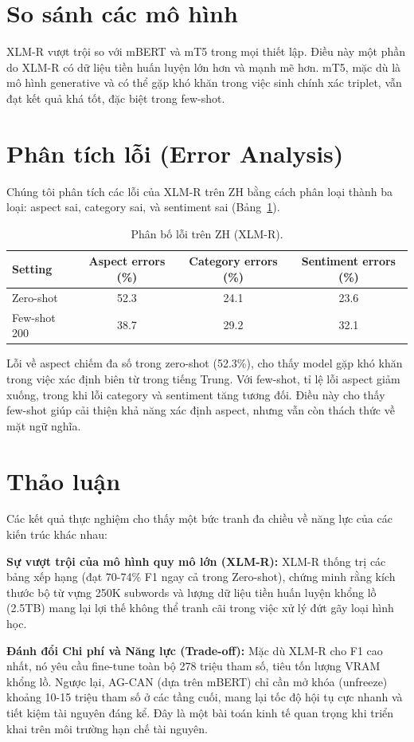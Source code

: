 \documentclass[12pt,a4paper,oneside]{report}
\begin{document}
\section{So sánh các mô hình}
XLM-R vượt trội so với mBERT và mT5 trong mọi thiết lập. Điều này một phần do XLM-R có dữ liệu tiền huấn luyện lớn hơn và mạnh mẽ hơn. mT5, mặc dù là mô hình generative và có thể gặp khó khăn trong việc sinh chính xác triplet, vẫn đạt kết quả khá tốt, đặc biệt trong few-shot.

\section{Phân tích lỗi (Error Analysis)}
Chúng tôi phân tích các lỗi của XLM-R trên ZH bằng cách phân loại thành ba loại: aspect sai, category sai, và sentiment sai (Bảng~\ref{tab:errors}).

\begin{table}[ht]
\centering
\caption{Phân bố lỗi trên ZH (XLM-R).}
\label{tab:errors}
\begin{tabular}{l c c c}
\toprule
Setting & Aspect errors (\%) & Category errors (\%) & Sentiment errors (\%) \\
\midrule
Zero-shot & 52.3 & 24.1 & 23.6 \\
Few-shot 200 & 38.7 & 29.2 & 32.1 \\
\bottomrule
\end{tabular}
\end{table}

Lỗi về aspect chiếm đa số trong zero-shot (52.3\%), cho thấy model gặp khó khăn trong việc xác định biên từ trong tiếng Trung. Với few-shot, tỉ lệ lỗi aspect giảm xuống, trong khi lỗi category và sentiment tăng tương đối. Điều này cho thấy few-shot giúp cải thiện khả năng xác định aspect, nhưng vẫn còn thách thức về mặt ngữ nghĩa.

\section{Thảo luận}
Các kết quả thực nghiệm cho thấy một bức tranh đa chiều về năng lực của các kiến trúc khác nhau:

\textbf{Sự vượt trội của mô hình quy mô lớn (XLM-R):} XLM-R thống trị các bảng xếp hạng (đạt 70-74\% F1 ngay cả trong Zero-shot), chứng minh rằng kích thước bộ từ vựng 250K subwords và lượng dữ liệu tiền huấn luyện khổng lồ (2.5TB) mang lại lợi thế không thể tranh cãi trong việc xử lý đứt gãy loại hình học. 

\textbf{Đánh đổi Chi phí và Năng lực (Trade-off):} Mặc dù XLM-R cho F1 cao nhất, nó yêu cầu fine-tune toàn bộ 278 triệu tham số, tiêu tốn lượng VRAM khổng lồ. Ngược lại, AG-CAN (dựa trên mBERT) chỉ cần mở khóa (unfreeze) khoảng 10-15 triệu tham số ở các tầng cuối, mang lại tốc độ hội tụ cực nhanh và tiết kiệm tài nguyên đáng kể. Đây là một bài toán kinh tế quan trọng khi triển khai trên môi trường hạn chế tài nguyên.
\end{document}

